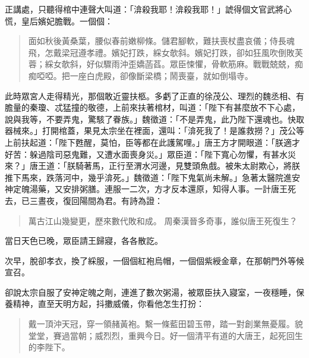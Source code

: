 正講處，只聽得棺中連聲大叫道：「渰殺我耶！渰殺我耶！」諕得個文官武將心慌，皇后嬪妃膽戰。一個個：
\begin{quote}
面如秋後黃桑葉，腰似春前嫩柳條。儲君腳軟，難扶喪杖盡哀儀；侍長魂飛，怎戴梁冠遵孝禮。嬪妃打跌，綵女欹斜。嬪妃打跌，卻如狂風吹倒敗芙蓉；綵女欹斜，好似驟雨沖歪嬌菡萏。眾臣悚懼，骨軟筋麻。戰戰兢兢，痴痴啞啞。把一座白虎殿，卻像斷梁橋；鬧喪臺，就如倒塌寺。
\end{quote}

此時眾宮人走得精光，那個敢近靈扶柩。多虧了正直的徐茂公、理烈的魏丞相、有膽量的秦瓊、忒猛撞的敬德，上前來扶著棺材，叫道：「陛下有甚麼放不下心處，說與我等，不要弄鬼，驚駭了眷族。」魏徵道：「不是弄鬼，此乃陛下還魂也。快取器械來。」打開棺蓋，果見太宗坐在裡面，還叫：「渰死我了！是誰救撈？」茂公等上前扶起道：「陛下甦醒，莫怕，臣等都在此護駕哩。」唐王方才開眼道：「朕適才好苦：躲過陰司惡鬼難，又遭水面喪身災。」眾臣道：「陛下寬心勿懼，有甚水災來？」唐王道：「朕騎著馬，正行至渭水河邊，見雙頭魚戲。被朱太尉欺心，將朕推下馬來，跌落河中，幾乎渰死。」魏徵道：「陛下鬼氣尚未解。」急著太醫院進安神定魄湯藥，又安排粥膳。連服一二次，方才反本還原，知得人事。一計唐王死去，已三晝夜，復回陽間為君。有詩為證：
\begin{quote}
萬古江山幾變更，歷來數代敗和成。
周秦漢晉多奇事，誰似唐王死復生？
\end{quote}

當日天色已晚，眾臣請王歸寢，各各散訖。

次早，脫卻孝衣，換了綵服，一個個紅袍烏帽，一個個紫綬金章，在那朝門外等候宣召。

卻說太宗自服了安神定魄之劑，連進了數次粥湯，被眾臣扶入寢室，一夜穩睡，保養精神，直至天明方起，抖擻威儀，你看他怎生打扮：
\begin{quote}
戴一頂沖天冠，穿一領赭黃袍。繫一條藍田碧玉帶，踏一對創業無憂履。貌堂堂，賽過當朝；威烈烈，重興今日。好一個清平有道的大唐王，起死回生的李陛下。
\end{quote}

